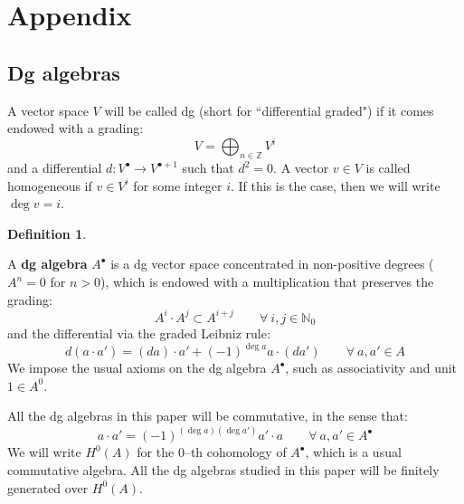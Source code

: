 \documentclass[12pt]{amsart}
\numberwithin{equation}{section}
\theoremstyle{definition}
\newtheorem{definition}[theorem]{Definition}
\theoremstyle{remark}
\newcommand{\NN}{\mathbb{N}}
\newcommand{\ZZ}{\mathbb{Z}}
\renewcommand{\1}{\mathbf{1}}
\begin{document}




\section{Appendix}
\label{sec:appendix}

\subsection{Dg algebras}
\label{sub:dg algebras}

A vector space $V$ will be called dg (short for ``differential graded") if it comes endowed with a grading:
$$
V = \bigoplus_{n\in \ZZ} V^i
$$
and a differential $d : V^\bullet \rightarrow V^{\bullet+1}$ such that $d^2=0$. A vector $v \in V$ is called homogeneous if $v\in V^i$ for some integer $i$. If this is the case, then we will write $\deg v = i$. 

\begin{definition}
\label{def:dg algebra}

A \textbf{dg algebra} $A^\bullet$ is a dg vector space concentrated in non-positive degrees ($A^n=0$ for $n>0$), which is endowed with a multiplication that preserves the grading:
$$
A^i \cdot A^j \subset A^{i+j} \qquad \forall \ i,j \in \NN_0
$$
and the differential via the graded Leibniz rule:
\begin{equation}
\label{eqn:leibniz}
d(a \cdot a') = (d a) \cdot a' + (-1)^{\deg a} a \cdot (da') \qquad \forall \ a,a'\in A
\end{equation}
We impose the usual axioms on the dg algebra $A^\bullet$, such as associativity and unit $1 \in A^0$. 

\end{definition}

All the dg algebras in this paper will be commutative, in the sense that:
\begin{equation}
\label{eqn:dg commutative}
a \cdot a' = (-1)^{(\deg a)(\deg a')} a' \cdot a \qquad \forall \ a,a'\in A^\bullet
\end{equation}
We will write $H^0(A)$ for the 0--th cohomology of $A^\bullet$, which is a usual commutative algebra. All the dg algebras studied in this paper will be finitely generated over $H^0(A)$. 
\end{document}

